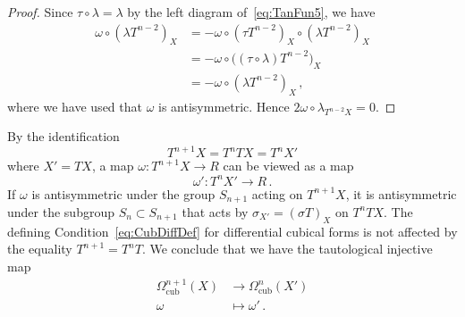 \documentclass[12pt,reqno, a4paper]{amsart}
\numberwithin{equation}{section}
\theoremstyle{plain}
\theoremstyle{definition}
\theoremstyle{remark}
\begin{document}
\begin{proof}
Since $\tau \circ \lambda = \lambda$ by the left diagram of~\eqref{eq:TanFun5}, we have
\begin{equation*}
\begin{split}
  \omega \circ (\lambda T^{n-2})_X
  &=
  - \omega \circ (\tau T^{n-2})_X \circ (\lambda T^{n-2})_X
  \\
  &=
  - \omega \circ \bigl( (\tau \circ \lambda) T^{n-2} \bigr)_X
  \\
  &=
  - \omega \circ (\lambda T^{n-2} )_X
  \,,
\end{split}
\end{equation*}
where we have used that $\omega$ is antisymmetric. Hence $2\omega \circ \lambda_{T^{n-2}X} = 0$.
\end{proof}

By the identification
\begin{equation*}
  T^{n+1}X = T^n TX = T^n X'
\end{equation*}
where $X' = TX$, a map $\omega\colon T^{n+1} X \to R$ can be viewed as a map
\begin{equation*}
  \omega'\colon T^n X' \longrightarrow R
  \,.
\end{equation*}
If $\omega$ is antisymmetric under the group $S_{n+1}$ acting on $T^{n+1} X$, it is antisymmetric under the subgroup $S_n \subset S_{n+1}$ that acts by  $\sigma_{X'} = (\sigma T)_X$ on $T^n TX$. The defining Condition~\eqref{eq:CubDiffDef} for differential cubical forms is not affected by the equality $T^{n+1} = T^n T$. We conclude that we have the tautological injective map
\begin{equation}
\label{eq:FormsTautMap}
\begin{aligned}
  \Omega^{n+1}_\mathrm{cub}(X)
  &\longrightarrow
  \Omega^{n}_\mathrm{cub}(X')
  \\
  \omega &\longmapsto \omega'
  \,.
\end{aligned}
\end{equation}
\end{document}
